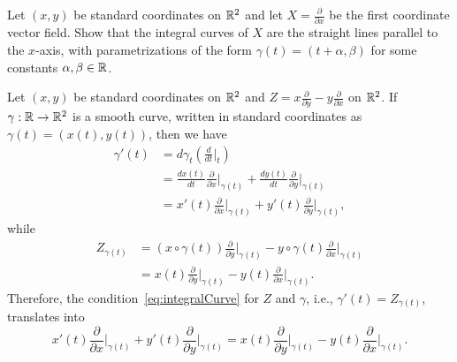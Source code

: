 \begin{exercise}
  Let $(x,y)$ be standard coordinates on $\mathbb{R}^2$ and let $X=\frac{\partial}{\partial x}$ be the first coordinate vector field.
  Show that the integral curves of $X$ are the straight lines parallel to the $x$-axis, with parametrizations of the form $\gamma(t) = (t + \alpha, \beta)$ for some constants $\alpha, \beta \in \mathbb{R}$.
\end{exercise}

\begin{example}\label{ex:rotation}
  Let $(x,y)$ be standard coordinates on $\mathbb{R}^2$ and $Z = x\frac{\partial}{\partial y} - y\frac{\partial}{\partial x}$ on $\mathbb{R}^2$.
  If $\gamma:\mathbb{R}\to\mathbb{R}^2$ is a smooth curve, written in standard coordinates as $\gamma(t) = (x(t), y(t))$, then we have
  \begin{align}
    \gamma'(t)
     & = d\gamma_t\left(\frac{d}{dt}\Big|_t\right)                                                                                         \\
     & = \frac{d x(t)}{d t} \frac{\partial}{\partial x}\Big|_{\gamma(t)} + \frac{d y(t)}{d t} \frac{\partial}{\partial y}\Big|_{\gamma(t)} \\
     & = x'(t)\frac{\partial}{\partial x}\Big|_{\gamma(t)} + y'(t)\frac{\partial}{\partial y}\Big|_{\gamma(t)},
  \end{align}
  while
  \begin{align}
    Z_{\gamma(t)}
     & = (x\circ \gamma(t))\frac{\partial}{\partial y}\Big|_{\gamma(t)} - y \circ \gamma(t)\frac{\partial}{\partial x}\Big|_{\gamma(t)} \\
     & = x(t)\frac{\partial}{\partial y}\Big|_{\gamma(t)} - y(t)\frac{\partial}{\partial x}\Big|_{\gamma(t)}.
  \end{align}
  Therefore, the condition~\eqref{eq:integralCurve} for $Z$ and $\gamma$, i.e., $\gamma'(t) = Z_{\gamma(t)}$, translates into
  \begin{equation}
    x'(t)\frac{\partial}{\partial x}\Big|_{\gamma(t)} + y'(t)\frac{\partial}{\partial y}\Big|_{\gamma(t)} = x(t)\frac{\partial}{\partial y}\Big|_{\gamma(t)} - y(t)\frac{\partial}{\partial x}\Big|_{\gamma(t)}.

\end{equation}
\end{example}
